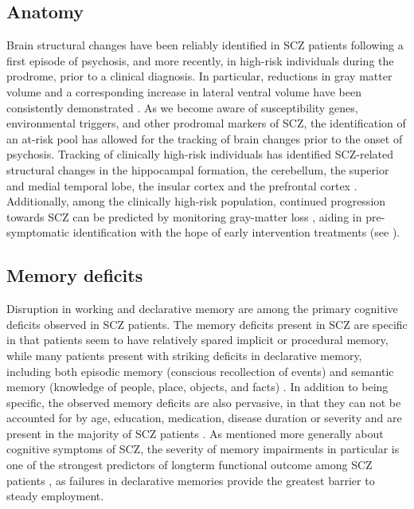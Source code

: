 \subsection{Anatomy}
Brain structural changes have been reliably identified in SCZ patients following a first episode of psychosis, and more recently, in high-risk individuals during the prodrome, prior to a clinical diagnosis.
In particular, reductions in gray matter volume and a corresponding increase in lateral ventral volume have been consistently demonstrated \citep{Fusar-Poli2013}\citep{Shepherd2012}.
As we become aware of susceptibility genes, environmental triggers, and other prodromal markers of SCZ, the identification of an at-risk pool has allowed for the tracking of brain changes prior to the onset of psychosis.
Tracking of clinically high-risk individuals has identified SCZ-related structural changes in the hippocampal formation, the cerebellum, the superior and medial temporal lobe, the insular cortex and the prefrontal cortex \citep{Cannon2015}\citep{Millan2016}.
Additionally, among the clinically high-risk population, continued progression towards SCZ can be predicted by monitoring gray-matter loss \citep{Tognin2014}, aiding in pre-symptomatic identification with the hope of early intervention treatments (see ).

\subsection{Memory deficits}
Disruption in working and declarative memory are among the primary cognitive deficits observed in SCZ patients.
The memory deficits present in SCZ are specific in that patients seem to have relatively spared implicit or procedural memory, while many patients present with striking deficits in declarative memory, including both episodic memory (conscious recollection of events) and semantic memory (knowledge of people, place, objects, and facts) \citep{O'Carroll2000}\citep{Aleman1999}\citep{Gold2010}.
In addition to being specific, the observed memory deficits are also pervasive, in that they can not be accounted for by age, education, medication, disease duration or severity \citep{Ranganath2008} and are present in the majority of SCZ patients \citep{}.
As mentioned more generally about cognitive symptoms of SCZ, the severity of memory impairments in particular is one of the strongest predictors of longterm functional outcome among SCZ patients \citep{Green1996}, as failures in declarative memories provide the greatest barrier to steady employment.

